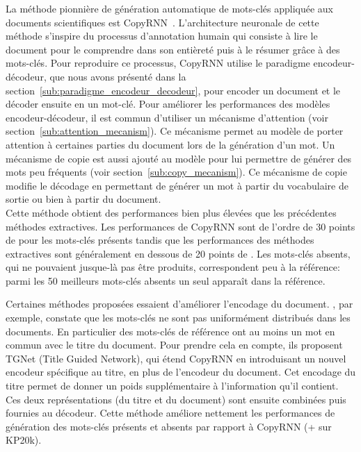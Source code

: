 La méthode pionnière de génération automatique de mots-clés appliquée aux documents scientifiques est CopyRNN~\cite{meng_deep_2017}.
%
L'architecture neuronale de cette méthode s'inspire du processus d'annotation humain qui consiste à lire le document pour le comprendre dans son entièreté puis à le résumer grâce à des mots-clés.
Pour reproduire ce processus, CopyRNN utilise le paradigme encodeur-décodeur, que nous avons présenté dans la section~\ref{sub:paradigme_encodeur_decodeur}, pour encoder un document et le décoder ensuite en un mot-clé. %
Pour améliorer les performances des modèles encodeur-décodeur, il est commun d'utiliser un mécanisme d'attention (voir section~\ref{sub:attention_mecanism}).
Ce mécanisme permet au modèle de porter attention à certaines parties du document lors de la génération d'un mot.
%
Un mécanisme de copie est aussi ajouté au modèle pour lui permettre de générer des mots peu fréquents (voir section~\ref{sub:copy_mecanism}).
Ce mécanisme de copie modifie le décodage en permettant de générer un mot à partir du vocabulaire de sortie ou bien à partir du document.\\
%
Cette méthode obtient des performances bien plus élevées que les précédentes méthodes extractives. Les performances de CopyRNN sont de l'ordre de 30 points de \fmesure{} pour les mots-clés présents tandis que les performances des méthodes extractives sont généralement en dessous de 20 points de \fmesure{}.
Les mots-clés absents, qui ne pouvaient jusque-là pas être produits, correspondent peu à la référence: parmi les 50 meilleurs mots-clés absents un seul apparaît dans la référence.



Certaines méthodes proposées essaient d'améliorer l'encodage du document.
\citet{chen_title-guided_2019}, par exemple, constate que les mots-clés ne sont pas uniformément distribués dans les documents.
En particulier  des mots-clés de référence ont au moins un mot en commun avec le titre du document.
Pour prendre cela en compte, ils proposent TGNet (Title Guided Network), qui étend CopyRNN en introduisant un nouvel encodeur spécifique au titre, en plus de l'encodeur du document.
Cet encodage du titre permet de donner un poids supplémentaire à l'information qu'il contient.
Ces deux représentations (du titre et du document) sont ensuite combinées puis fournies au décodeur.
Cette méthode améliore nettement les performances de génération des mots-clés présents et absents par rapport à CopyRNN (+ sur KP20k).

